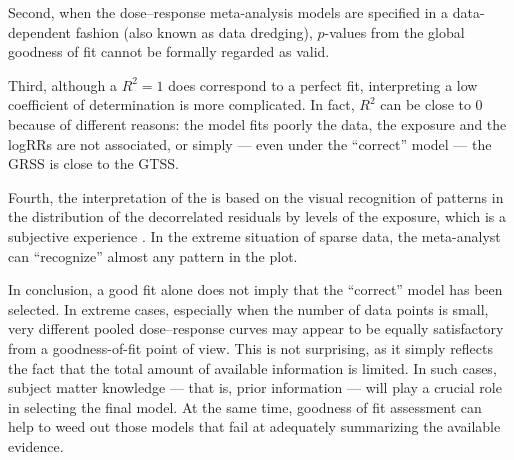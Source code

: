 Second, when the dose--response meta-analysis models are specified in a data-dependent fashion (also known as data dredging), $p$-values from the global goodness of fit cannot be formally regarded as valid.

Third, although a $R^2=1$ does correspond to a perfect fit, interpreting a low coefficient of determination is more complicated. In fact, $R^2$ can be close to 0 because of different reasons: the model fits poorly the data, the  exposure and the logRRs are not associated, or simply  --- even under the ``correct'' model --- the GRSS is close to the GTSS.

Fourth, the interpretation of the \rveplot{} is based on the visual recognition of patterns in the distribution of the decorrelated residuals by levels of the exposure, which is a subjective experience \citep{greenland_invited_1994}. In the extreme situation of sparse data, the meta-analyst can ``recognize'' almost any pattern in the plot.


In conclusion, a good fit alone does not imply that the ``correct'' model has been selected. In extreme cases, especially when the number of data points is small, very different pooled dose--response curves may appear to be equally satisfactory from a goodness-of-fit point of view. This is not surprising, as it simply reflects the fact that the total amount of available information is limited. In such cases, subject matter knowledge --- that is, prior information --- will play a crucial role in selecting the final model. At the same time, goodness of fit assessment can help to weed out those models that fail at adequately summarizing the available evidence.








